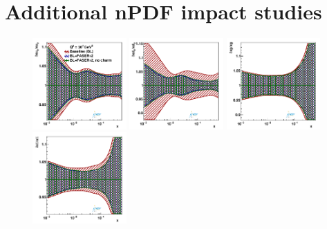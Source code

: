 \section{Additional nPDF impact studies}
\label{app:nPDF_impact_appendix}

\begin{figure}[htbp]
	\centering
	\includegraphics[width=0.32\textwidth]{plots/nuclear_fasernu2/inclusive-only_vs_inclusive+charm/statOnly_FASERv2_q2_10000_pdf_uv_ratio.pdf}
	\includegraphics[width=0.32\textwidth]{plots/nuclear_fasernu2/inclusive-only_vs_inclusive+charm/statOnly_FASERv2_q2_10000_pdf_dv_ratio.pdf}
	\includegraphics[width=0.32\textwidth]{plots/nuclear_fasernu2/inclusive-only_vs_inclusive+charm/statOnly_FASERv2_q2_10000_pdf_g_ratio.pdf}\\
	\includegraphics[width=0.32\textwidth]{plots/nuclear_fasernu2/inclusive-only_vs_inclusive+charm/statOnly_FASERv2_q2_10000_pdf_Sea_ratio.pdf}

\end{figure}
